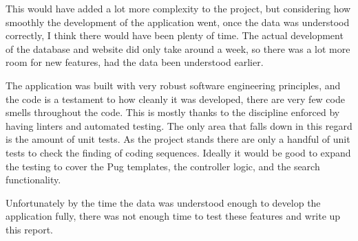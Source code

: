 This would have added a lot more complexity to the project, but considering how smoothly the development of the application went, once the data was understood correctly, I think there would have been plenty of time. The actual development of the database and website did only take around a week, so there was a lot more room for new features, had the data been understood earlier. 

The application was built with very robust software engineering principles, and the code is a testament to how cleanly it was developed, there are very few code smells\cite{smells} throughout the code. This is mostly thanks to the discipline enforced by having linters and automated testing. The only area that falls down in this regard is the amount of unit tests. As the project stands there are only a handful of unit tests to check the finding of coding sequences. Ideally it would be good to expand the testing to cover the Pug templates, the controller logic, and the search functionality. 

Unfortunately by the time the data was understood enough to develop the application fully, there was not enough time to test these features and write up this report. 





